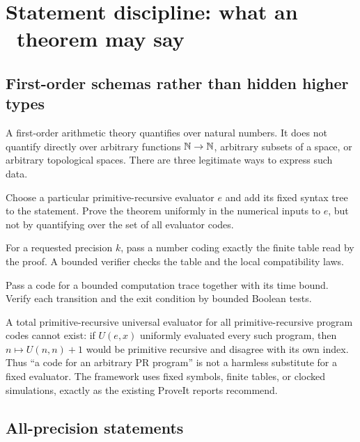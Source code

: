 
\section{Statement discipline: what an \ipra\ theorem may say}
\label{sec:discipline}

\subsection{First-order schemas rather than hidden higher types}

A first-order arithmetic theory quantifies over natural numbers.  It does not quantify directly over arbitrary functions $\mathbb{N}\to\mathbb{N}$, arbitrary subsets of a space, or arbitrary topological spaces.  There are three legitimate ways to express such data.

\begin{definition}
Choose a particular primitive-recursive evaluator $e$ and add its fixed  syntax tree to the statement.  Prove the theorem uniformly in the numerical inputs to $e$, but not by quantifying over the set of all evaluator codes.
\end{definition}

\begin{definition}
For a requested precision $k$, pass a number coding exactly the finite table read by the proof.  A bounded verifier checks the table and the local compatibility laws.
\end{definition}

\begin{definition}
Pass a code for a bounded computation trace together with its time bound.  Verify each transition and the exit condition by bounded Boolean tests.
\end{definition}

A total primitive-recursive universal evaluator for all primitive-recursive program codes cannot exist: if $U(e,x)$ uniformly evaluated every such program, then $n\mapsto U(n,n)+1$ would be primitive recursive and disagree with its own index.  Thus ``a code for an arbitrary PR program'' is not a harmless substitute for a fixed evaluator.  The framework uses fixed symbols, finite tables, or clocked simulations, exactly as the existing ProveIt reports recommend.

\subsection{All-precision statements}

